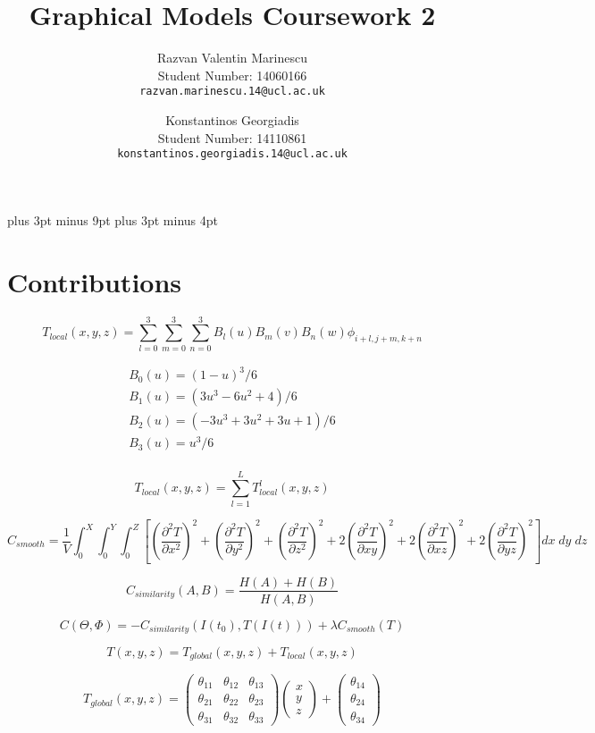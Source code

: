 \documentclass[11pt,a4paper,oneside]{report}
\title{Graphical Models Coursework 2}
\author{
    Razvan Valentin Marinescu\\
    Student Number: 14060166\\
  \texttt{razvan.marinescu.14@ucl.ac.uk}
  \and
    Konstantinos Georgiadis\\
    Student Number: 14110861\\
  \texttt{konstantinos.georgiadis.14@ucl.ac.uk}
}
\begin{document}
\belowdisplayskip=12pt plus 3pt minus 9pt
\belowdisplayshortskip=7pt plus 3pt minus 4pt

\maketitle{}

\section*{Contributions}

\begin{equation}
 T_{local}(x,y,z) = \sum_{l=0}^3\sum_{m=0}^3\sum_{n=0}^3B_{l}(u)B_{m}(v)B_{n}(w)\phi_{i+l,j+m,k+n}
\end{equation}
 
 
 \begin{gather*}
  B_0(u)=(1-u)^3/6\\
  B_1(u)=(3u^3-6u^2+4)/6\\
  B_2(u)=(-3u^3+3u^2+3u+1)/6\\
  B_3(u)=u^3/6\\
 \end{gather*}

 $$T_{local} (x,y,z) = \sum_{l=1}^L T_{local}^{l}(x,y,z) $$
 
 $$C_{smooth}=\frac{1}{V}\int_0^X\int_0^Y\int_0^Z\left[ \left(\frac{\partial^2T}{\partial x^2}\right)^2 + \left(\frac{\partial^2T}{\partial y^2}\right)^2 + \left(\frac{\partial^2T}{\partial z^2}\right)^2 + 2 \left(\frac{\partial^2T}{\partial xy}\right)^2 + 2 \left(\frac{\partial^2T}{\partial xz}\right)^2 + 2 \left(\frac{\partial^2T}{\partial yz}\right)^2 \right]dx\;dy\;dz$$
 
 $$C_{similarity}(A,B) = \frac{H(A) + H(B)}{H(A,B)} $$
 
 $$C(\Theta, \Phi)=-C_{similarity}(I(t_0), T(I(t))) + \lambda C_{smooth}(T)$$
 
 $$T(x,y,z)=T_{global}(x,y,z)+T_{local}(x,y,z)$$
 
 $$T_{global}(x,y,z)=\begin{pmatrix}
  \theta_{11}  & \theta_{12}  & \theta_{13} \\
  \theta_{21}  & \theta_{22}  & \theta_{23} \\
  \theta_{31}  & \theta_{32}  & \theta_{33}
 \end{pmatrix}\begin{pmatrix}
  x \\
  y \\
  z
 \end{pmatrix}+\begin{pmatrix}
  \theta_{14} \\
  \theta_{24} \\
  \theta_{34}
 \end{pmatrix}
 $$
 
\end{document}
